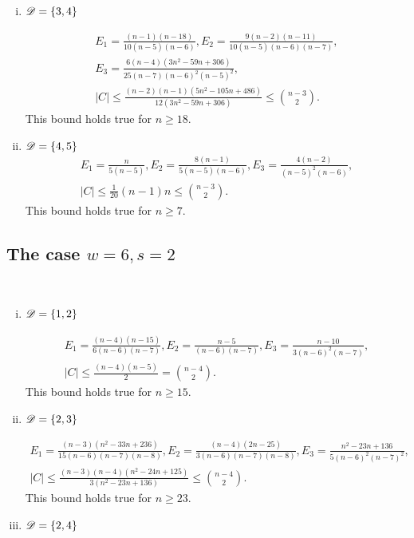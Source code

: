 \documentclass{amsart}
\begin{document}
{\begin{enumerate}[(i)]
\item $\mathscr{D}=\{3,4\}$

\begin{gather*}
E_1=\frac{(n-1) (n-18)}{10(n-5) (n-6)},E_2=\frac{9(n-2)(n-11) }{10 (n-5)(n-6) (n-7)},\\
E_3=\frac{6 (n-4) \left(3 n^2-59 n+306\right)}{25 (n-7) (n-6)^2 (n-5)^2},\\
|C|\le\frac{(n-2) (n-1) \left(5 n^2-105 n+486\right)}{12 \left(3 n^2-59 n+306\right)}\le\binom{n-3}2.
\end{gather*}
This bound holds true for $n\ge 18.$

\item $\mathscr{D}=\{4,5\}$
\begin{gather*}
E_1=\frac{n}{5(n-5)},E_2=\frac{8(n-1)}{5 (n-5)(n-6)},E_3=\frac{4 (n-2)}{(n-5)^2(n-6) },\\
|C|\le\frac{1}{20} (n-1) n\le\binom{n-3}2.
\end{gather*}
This bound holds true for $n\ge 7.$

\end{enumerate}

\subsection{The case \texorpdfstring{$w=6,s=2$}.}\label{App:6,2} \hfill\\

\begin{enumerate}[(i)]
\item $\mathscr{D} = \{1, 2\}$

\begin{gather*}
E_1=\frac{(n-4)(n-15)}{6(n-6) (n-7)},E_2=\frac{n-5}{ (n-6)(n-7)},E_3=\frac{n-10}{3 (n-6)^2(n-7)},\\
|C| \leq \frac{(n-4)(n-5)}{2} = \binom{n-4}{2}.
\end{gather*}
This bound holds true for $n\ge 15$.

\item $\mathscr{D} = \{2, 3\}$

\begin{gather*}
E_1=\frac{(n-3)\left(n^2-33n+236\right)}{15(n-6) (n-7)(n-8)},E_2=\frac{(n-4)(2n-25)}{3 (n-6) (n-7)(n-8)},E_3=\frac{n^2-23 n+136}{5 (n-6)^2 (n-7)^2},\\
|C| \leq \frac{(n-3)(n-4)(n^2-24n+125)}{3(n^2-23n+136)}\leq \binom{n-4}{2}.
\end{gather*}
This bound holds true for $n\ge23.$

\item $\mathscr{D} = \{2, 4\}$


\end{enumerate}}
\end{document}
